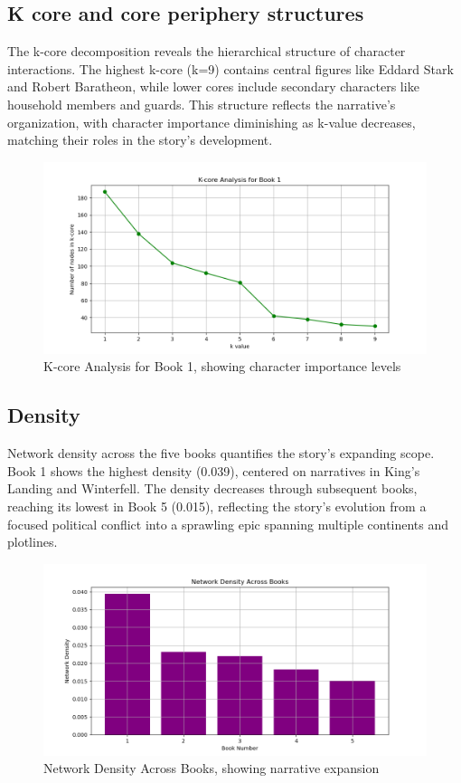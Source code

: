 \documentclass[12pt, a4paper]{article}
\begin{document}
\subsection{K core and core periphery structures}
The k-core decomposition reveals the hierarchical structure of character interactions. The highest k-core (k=9) contains central figures like Eddard Stark and Robert Baratheon, while lower cores include secondary characters like household members and guards. This structure reflects the narrative's organization, with character importance diminishing as k-value decreases, matching their roles in the story's development.

\begin{figure}[H]
    \centering
    \includegraphics[width=1\linewidth]{kcore_book1.png}
    \caption{K-core Analysis for Book 1, showing character importance levels}
    \label{fig:kcore}
\end{figure}

\subsection{Density}
Network density across the five books quantifies the story's expanding scope. Book 1 shows the highest density (0.039), centered on narratives in King's Landing and Winterfell. The density decreases through subsequent books, reaching its lowest in Book 5 (0.015), reflecting the story's evolution from a focused political conflict into a sprawling epic spanning multiple continents and plotlines.

\begin{figure}[H]
    \centering
    \includegraphics[width=0.8\linewidth]{density_books.png}
    \caption{Network Density Across Books, showing narrative expansion}
    \label{fig:density}
\end{figure}
\end{document}
